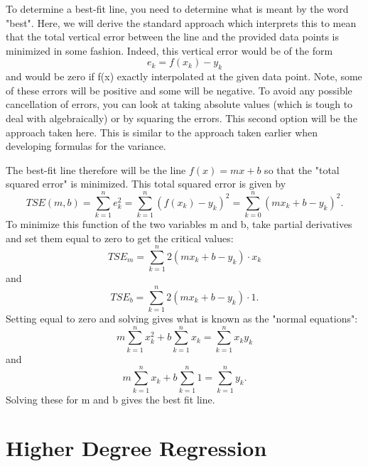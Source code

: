\documentclass[10pt,]{book}
\theoremstyle{plain}
\theoremstyle{definition}
\theoremstyle{definition}
\theoremstyle{definition}
\numberwithin{equation}{section}
\begin{document}
To determine a best-fit line, you need to determine what is meant by the word "best". Here, we will derive the standard approach which interprets this to mean that the total vertical error between the line and the provided data points is minimized in some fashion.  Indeed, this vertical error would be of the form
\begin{equation*}e_k = f(x_k) - y_k\end{equation*}
and would be zero if f(x) exactly interpolated at the given data point.  Note, some of these errors will be positive and some will be negative. To avoid any possible cancellation of errors, you can look at taking absolute values (which is tough to deal with algebraically) or by squaring the errors. This second option will be the approach taken here. This is similar to the approach taken earlier when developing formulas for the variance.
%
\par
The best-fit line therefore will be the line \(f(x) = mx+b\) so that the "total squared error" is minimized. This total squared error is given by
\begin{equation*}TSE(m,b) = \sum_{k=1}^n e_k^2 = \sum_{k=1}^n (f(x_k) - y_k)^2 = \sum_{k=0}^n (m x_k + b - y_k)^2.\end{equation*}
To minimize this function of the two variables m and b, take partial derivatives and set them equal to zero to get the critical values:
\begin{equation*}TSE_m = \sum_{k=1}^n 2(m x_k + b - y_k) \cdot x_k\end{equation*}
and
\begin{equation*}TSE_b = \sum_{k=1}^n 2(m x_k + b - y_k) \cdot 1 .\end{equation*}
Setting equal to zero and solving gives what is known as the "normal equations":
\begin{equation*}m \sum_{k=1}^n x_k^2 + b \sum_{k=1}^n x_k = \sum_{k=1}^n x_k y_k\end{equation*}
and
\begin{equation*}m \sum_{k=1}^n x_k + b \sum_{k=1}^n 1 = \sum_{k=1}^n y_k.\end{equation*}
Solving these for m and b gives the best fit line.
%
\typeout{************************************************}
\typeout{************************************************}
\section[{Higher Degree Regression}]{Higher Degree Regression}\label{section-12}
\end{document}
